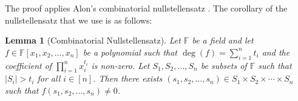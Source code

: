 \documentclass[12]{article}
\newtheorem{lem}{Lemma} %
\theoremstyle{definition}
\begin{document}
	
	
	The proof applies Alon's combinatorial nullstellensatz \cite{alon}.  The corollary of the nullstellensatz that we use is as follows:
	
	\begin{lem}[Combinatorial Nullstellensatz]\label{Lemma-CombinatorialNullstellensatz}
		Let $\mathbb{F}$ be a field and let $f \in \mathbb{F}[x_1,x_2,\ldots,x_n]$ be a polynomial such that $\deg(f) = \sum_{i=1}^n t_i$ and the coefficient of $\prod_{i=1}^n x_i^{t_i}$ is non-zero.  Let $S_1,S_2,\ldots,S_n$ be subsets of $\mathbb{F}$ such that $|S_i| > t_i$ for all $i \in [n]$.  Then there exists $(s_1,s_2,\ldots,s_n) \in S_1 \times S_2 \times \cdots \times S_n$ such that $f(s_1,s_2,\ldots,s_n) \neq 0$.
	\end{lem}
	
\end{document}
